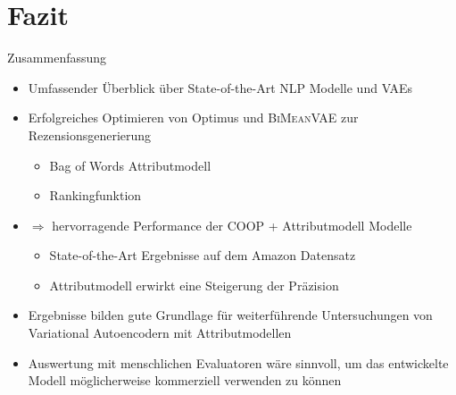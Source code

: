 \section{Fazit}

\begin{frame}{Zusammenfassung}

  \begin{itemize}
    \item Umfassender Überblick über State-of-the-Art NLP Modelle und VAEs
    \item Erfolgreiches Optimieren von Optimus und \textsc{BiMeanVAE} zur Rezensionsgenerierung
    \begin{itemize}
      \item Bag of Words Attributmodell
      \item Rankingfunktion
    \end{itemize}
    \item $\Rightarrow$ hervorragende Performance der COOP + Attributmodell Modelle \begin{itemize} \item State-of-the-Art Ergebnisse auf dem Amazon Datensatz \item Attributmodell erwirkt eine Steigerung der Präzision \end{itemize}
  \item Ergebnisse bilden gute Grundlage für weiterführende Untersuchungen von Variational Autoencodern mit Attributmodellen
  \item Auswertung mit menschlichen Evaluatoren wäre sinnvoll, um das entwickelte Modell möglicherweise kommerziell verwenden zu können
  \end{itemize}
    
\end{frame}


    
